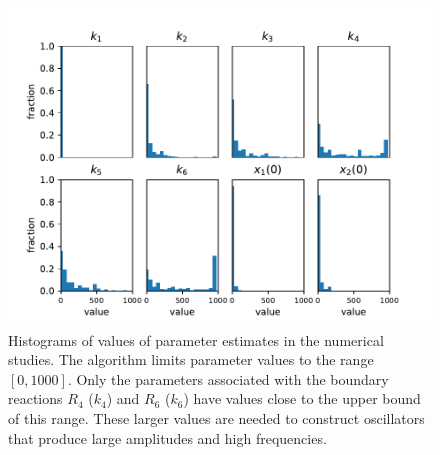 \documentclass{bmcart}
\begin{document}
\begin{backmatter}
\begin{figure}
        \centering
         \includegraphics[scale=0.75]{figures/Figure_7.pdf}
         \caption[]{Histograms of values of parameter estimates in the numerical studies. The algorithm limits parameter values to the range $[0, 1000]$. Only the parameters associated with the boundary reactions $R_4$ ($k_4$) and $R_6$ ($k_6$) have values close to the upper bound of this range. These larger values are needed to construct oscillators that produce large amplitudes and high frequencies.} 
         \label{fig:histogram-of-parameter-values}
\end{figure}





\end{backmatter}
\end{document}
